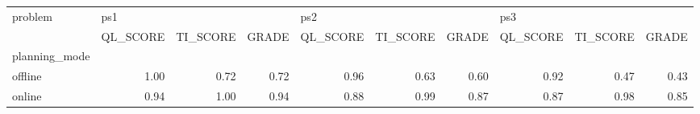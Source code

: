 \begin{tabular}{lrrrrrrrrr}
\toprule
problem & \multicolumn{3}{l}{ps1} & \multicolumn{3}{l}{ps2} & \multicolumn{3}{l}{ps3} \\
{} & QL\_SCORE & TI\_SCORE & GRADE & QL\_SCORE & TI\_SCORE & GRADE & QL\_SCORE & TI\_SCORE & GRADE \\
planning\_mode &          &          &       &          &          &       &          &          &       \\
\midrule
offline       &     1.00 &     0.72 &  0.72 &     0.96 &     0.63 &  0.60 &     0.92 &     0.47 &  0.43 \\
online        &     0.94 &     1.00 &  0.94 &     0.88 &     0.99 &  0.87 &     0.87 &     0.98 &  0.85 \\
\bottomrule
\end{tabular}
